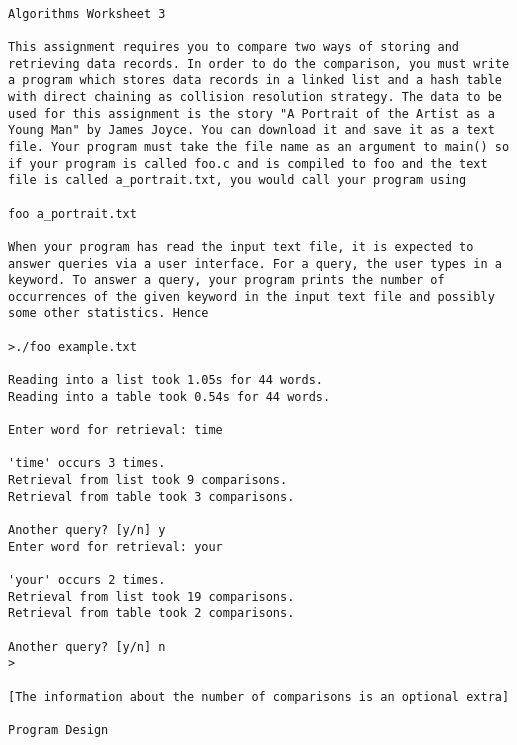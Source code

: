 \documentclass[11pt,a4paper]{scrartcl}
\begin{document}
\begin{verbatim}

Algorithms Worksheet 3

This assignment requires you to compare two ways of storing and
retrieving data records. In order to do the comparison, you must write
a program which stores data records in a linked list and a hash table
with direct chaining as collision resolution strategy. The data to be
used for this assignment is the story "A Portrait of the Artist as a
Young Man" by James Joyce. You can download it and save it as a text
file. Your program must take the file name as an argument to main() so
if your program is called foo.c and is compiled to foo and the text
file is called a_portrait.txt, you would call your program using

foo a_portrait.txt

When your program has read the input text file, it is expected to
answer queries via a user interface. For a query, the user types in a
keyword. To answer a query, your program prints the number of
occurrences of the given keyword in the input text file and possibly
some other statistics. Hence

>./foo example.txt

Reading into a list took 1.05s for 44 words.
Reading into a table took 0.54s for 44 words.

Enter word for retrieval: time

'time' occurs 3 times.
Retrieval from list took 9 comparisons.
Retrieval from table took 3 comparisons.

Another query? [y/n] y
Enter word for retrieval: your

'your' occurs 2 times.
Retrieval from list took 19 comparisons.
Retrieval from table took 2 comparisons.

Another query? [y/n] n
>

[The information about the number of comparisons is an optional extra]

Program Design


\end{verbatim}
\end{document}

